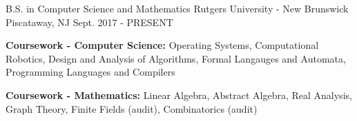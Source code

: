 


\begin{cventries}


  \cventry
  {B.S. in Computer Science and Mathematics} %
  {Rutgers University - New Brunswick} %
  {Piscataway, NJ} %
  {Sept. 2017 - PRESENT} %
  { %
    \begin{cvitems}
    \item {\textbf{Coursework - Computer Science:} Operating Systems, Computational Robotics, Design and Analysis of Algorithms, Formal Langauges and Automata, Programming Languages and Compilers}
    \item {\textbf{Coursework - Mathematics:} Linear Algebra, Abstract Algebra, Real Analysis, Graph Theory, Finite Fields (audit), Combinatorics (audit)}
    \end{cvitems}
  }


\end{cventries}
